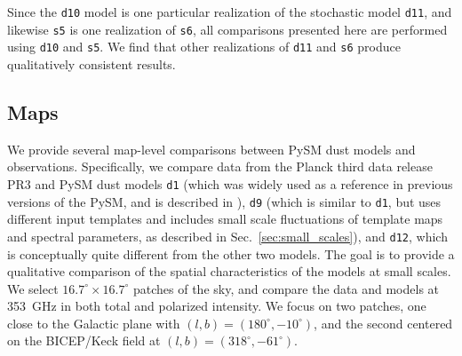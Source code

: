 \documentclass[twocolumn]{aastex631}
\begin{document}
Since the \texttt{d10} model is one particular realization of the stochastic model \texttt{d11}, and likewise \texttt{s5} is one realization of \texttt{s6}, all comparisons presented here are performed using \texttt{d10} and \texttt{s5}. We find that other realizations of \texttt{d11} and \texttt{s6} produce qualitatively consistent results.

\subsection{Maps}\label{subsec:maps}



We provide several map-level comparisons between PySM dust models and observations. 
Specifically, we compare data from the Planck third data release PR3 \cite{planck2016-l03} and PySM dust models \texttt{d1} (which was widely used as a reference in previous versions of the PySM, and is described in \cite{Thorne:2017}), {\tt d9} (which is similar to \texttt{d1}, but uses different input templates and includes small scale fluctuations of template maps and spectral parameters, as described in Sec.~\ref{sec:small_scales}), and {\tt d12}, which is conceptually quite different from the other two models. The goal is to provide a qualitative comparison of the spatial characteristics of the models at small scales. We select $16.7^\circ \times 16.7^\circ$ patches of the sky, and compare the data and models at 353~GHz in both total and polarized intensity. We focus on two patches, one close to the Galactic plane with $(l,b) =(180^\circ,-10^\circ)$, and the second centered on the BICEP/Keck field at $(l,b) =(318^\circ,-61^\circ)$. 
\end{document}
